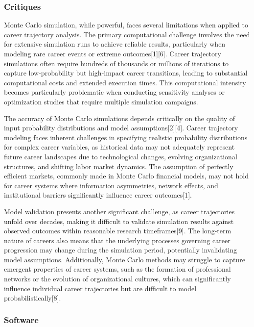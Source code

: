 \documentclass[main.tex]{subfiles}
\begin{document}
\subsubsection{Critiques}

Monte Carlo simulation, while powerful, faces several limitations when applied to career trajectory analysis. The primary computational challenge involves the need for extensive simulation runs to achieve reliable results, particularly when modeling rare career events or extreme outcomes[1][6]. Career trajectory simulations often require hundreds of thousands or millions of iterations to capture low-probability but high-impact career transitions, leading to substantial computational costs and extended execution times. This computational intensity becomes particularly problematic when conducting sensitivity analyses or optimization studies that require multiple simulation campaigns.

The accuracy of Monte Carlo simulations depends critically on the quality of input probability distributions and model assumptions[2][4]. Career trajectory modeling faces inherent challenges in specifying realistic probability distributions for complex career variables, as historical data may not adequately represent future career landscapes due to technological changes, evolving organizational structures, and shifting labor market dynamics. The assumption of perfectly efficient markets, commonly made in Monte Carlo financial models, may not hold for career systems where information asymmetries, network effects, and institutional barriers significantly influence career outcomes[1].

Model validation presents another significant challenge, as career trajectories unfold over decades, making it difficult to validate simulation results against observed outcomes within reasonable research timeframes[9]. The long-term nature of careers also means that the underlying processes governing career progression may change during the simulation period, potentially invalidating model assumptions. Additionally, Monte Carlo methods may struggle to capture emergent properties of career systems, such as the formation of professional networks or the evolution of organizational cultures, which can significantly influence individual career trajectories but are difficult to model probabilistically[8].

\subsubsection{Software}
\end{document}
